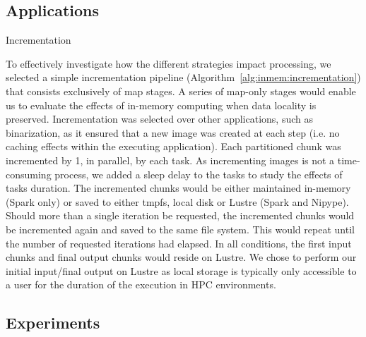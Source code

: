 \subsection{Applications} %
\begin{algorithm2e}\caption{Incrementation}\label{alg:inmem:incrementation}
\SetAlgoLined {} 
\end{algorithm2e}

To effectively investigate how the different strategies impact processing, we
selected a simple incrementation pipeline (Algorithm~\ref{alg:inmem:incrementation})
that consists exclusively of map stages. A series of map-only stages would
enable us to evaluate the effects of in-memory computing when data locality is
preserved. Incrementation was selected over other applications, such as
binarization, as it ensured that a new image was created at each step (i.e. no
caching effects within the executing application). Each partitioned chunk was
incremented by 1, in parallel, by each task. As incrementing images is not a
time-consuming process, we added a sleep delay to the tasks to study the effects
of tasks duration. The incremented chunks would be either maintained in-memory
(Spark only) or saved to either tmpfs, local disk or Lustre (Spark and Nipype).
Should more than a single iteration be requested, the incremented chunks would
be incremented again and saved to the same file system. This would repeat until
the number of requested iterations had elapsed. In all conditions, the first
input chunks and final output chunks would reside on Lustre. We chose to perform
our initial input/final output on Lustre as local storage is typically only
accessible to a user for the duration of the execution in HPC environments.

\subsection{Experiments}

